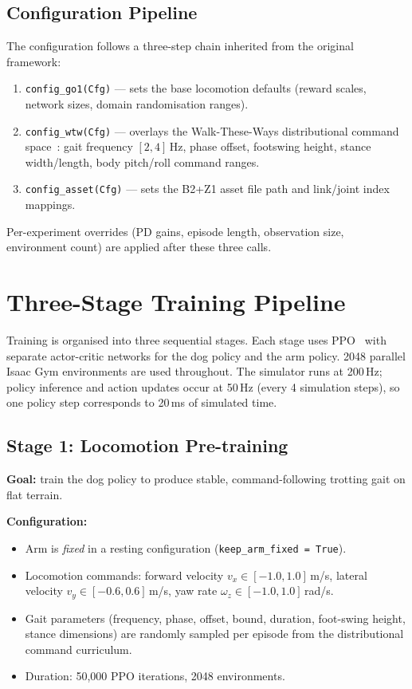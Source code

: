 \subsection{Configuration Pipeline}

The configuration follows a three-step chain inherited from the
original framework:
\begin{enumerate}
  \item \texttt{config\_go1(Cfg)} --- sets the base locomotion defaults
        (reward scales, network sizes, domain randomisation ranges).
  \item \texttt{config\_wtw(Cfg)} --- overlays the Walk-These-Ways
        distributional command space~\cite{margolis2022walk}:
        gait frequency $[2,4]$\,Hz, phase offset, footswing height,
        stance width/length, body pitch/roll command ranges.
  \item \texttt{config\_asset(Cfg)} --- sets the B2+Z1 asset file path
        and link/joint index mappings.
\end{enumerate}
Per-experiment overrides (PD gains, episode length, observation size,
environment count) are applied after these three calls.

\section{Three-Stage Training Pipeline}
\label{sec:training_pipeline}

Training is organised into three sequential stages.
Each stage uses PPO~\cite{schulman2017proximal} with separate
actor-critic networks for the dog policy and the arm policy.
2048 parallel Isaac Gym environments are used throughout.
The simulator runs at 200\,Hz; policy inference and action
updates occur at 50\,Hz (every 4 simulation steps), so one
policy step corresponds to 20\,ms of simulated time.

\subsection{Stage 1: Locomotion Pre-training}

\textbf{Goal:} train the dog policy to produce stable, command-following
trotting gait on flat terrain.

\textbf{Configuration:}
\begin{itemize}
  \item Arm is \emph{fixed} in a resting configuration
        (\texttt{keep\_arm\_fixed = True}).
  \item Locomotion commands: forward velocity $v_x \in [-1.0, 1.0]$\,m/s,
        lateral velocity $v_y \in [-0.6, 0.6]$\,m/s,
        yaw rate $\omega_z \in [-1.0, 1.0]$\,rad/s.
  \item Gait parameters (frequency, phase, offset, bound, duration,
        foot-swing height, stance dimensions) are randomly sampled
        per episode from the distributional command curriculum.
  \item Duration: 50,000 PPO iterations, 2048 environments.
\end{itemize}

